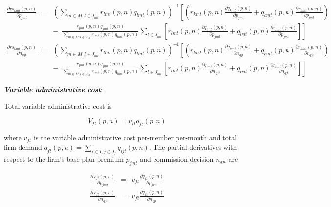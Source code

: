 \documentclass[12pt]{article}
\begin{document}
	\begin{eqnarray*}
	\frac{ \partial rs_{kmt}(\textit{p},\textit{n})}{\partial p_{jmt}} 
	&=& \left(\sum_{m\in M,l \in J_{mt}} r_{lmt}(\textit{p},\textit{n}) q_{lmt}(\textit{p},\textit{n})\right)^{-1}\left[\left(r_{kmt}(\textit{p},\textit{n})\frac{\partial q_{kmt}(\textit{p},\textit{n})}{\partial p_{jmt}} + q_{kmt}(\textit{p},\textit{n})\frac{\partial r_{kmt}(\textit{p},\textit{n})}{\partial p_{jmt}} \right) \right.\\
	&& - \,\,\, \left. \frac{r_{jmt}(\textit{p},\textit{n}) q_{jmt}(\textit{p},\textit{n})}{\sum_{m\in M,l \in J_{mt}} r_{lmt}(\textit{p},\textit{n}) q_{lmt}(\textit{p},\textit{n})}\sum_{l \in J_{mt}} \left[r_{lmt}(\textit{p},\textit{n})\frac{\partial q_{lmt}(\textit{p},\textit{n})}{\partial p_{jmt}} + q_{lmt}(\textit{p},\textit{n})\frac{\partial r_{lmt}(\textit{p},\textit{n})}{\partial p_{jmt}} \right]\right] \\
	\frac{ \partial rs_{kmt}(\textit{p},\textit{n})}{\partial n_{gjt}} 
	&=& \left(\sum_{m\in M,l \in J_{mt}} r_{lmt}(\textit{p},\textit{n}) q_{lmt}(\textit{p},\textit{n})\right)^{-1}\left[\left(r_{kmt}(\textit{p},\textit{n})\frac{\partial q_{kmt}(\textit{p},\textit{n})}{\partial n_{gjt}} + q_{kmt}(\textit{p},\textit{n})\frac{\partial r_{kmt}(\textit{p},\textit{n})}{\partial n_{gjt}} \right) \right.\\
	&& - \,\,\, \left. \frac{r_{jmt}(\textit{p},\textit{n}) q_{jmt}(\textit{p},\textit{n})}{\sum_{m\in M,l \in J_{mt}} r_{lmt}(\textit{p},\textit{n}) q_{lmt}(\textit{p},\textit{n})}\sum_{l \in J_{mt}} \left[r_{lmt}(\textit{p},\textit{n})\frac{\partial q_{lmt}(\textit{p},\textit{n})}{\partial n_{gjt}} + q_{lmt}(\textit{p},\textit{n})\frac{\partial r_{lmt}(\textit{p},\textit{n})}{\partial n_{gjt}} \right]\right]
	\end{eqnarray*}		
	
	
	

	
	
\noindent \textit{\bf Variable administrative cost}:
	
\noindent Total variable administrative cost is	
	
	\vspace{-0.3in}		
	
		$$
		V_{ft}(\textit{p},\textit{n}) = v_{ft} q_{ft}(\textit{p},\textit{n})
		$$	
	
		 
\noindent where $v_{ft}$ is the variable administrative cost per-member per-month and total firm demand $q_{ft}(\textit{p},\textit{n}) = \sum_{i \in I, j \in J_f} q_{ijt}(\textit{p},\textit{n})$.  The partial derivatives with respect to the firm's base plan premium $p_{jmt}$ and commission decision $n_{gjt}$ are 				 
		 
		\vspace{-0.4in}	

	\begin{eqnarray*}
	\frac{ \partial V_{ft}(\textit{p},\textit{n})}{\partial p_{jmt}} &=& v_{ft} \frac{\partial q_{ft}(\textit{p},\textit{n})}{\partial p_{jmt}} \\
	\frac{ \partial V_{ft}(\textit{p},\textit{n})}{\partial n_{gjt}} &=& v_{ft} \frac{\partial q_{ft}(\textit{p},\textit{n})}{\partial n_{gjt}}
	\end{eqnarray*}
\end{document}
